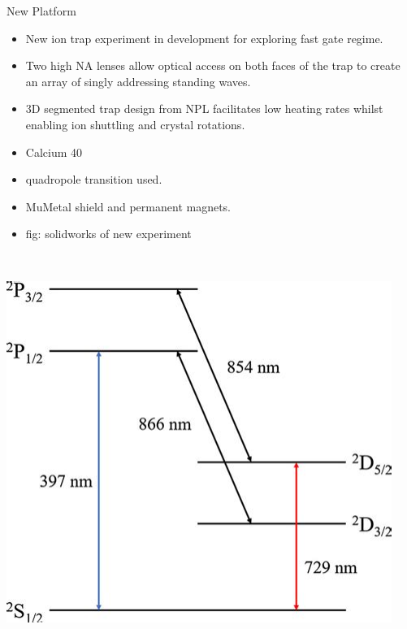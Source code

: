 \documentclass[final]{beamer}
\begin{document}
\begin{frame}{}
\begin{center}
\begin{columns}[t]
\begin{column}{0.49\textwidth}
    \begin{alertblock}{New Platform}
      \begin{minipage}{0.58\textwidth}
      \begin{itemize}
      \item New ion trap experiment in development for exploring fast
        gate regime.
      \item Two high NA lenses allow optical
        access on both faces of the trap to create an array of singly
        addressing standing waves.
      \item 3D segmented trap design from NPL facilitates low heating
        rates whilst enabling ion shuttling and crystal rotations.
      \item Calcium 40
      \item quadropole transition used.
      \item MuMetal shield and permanent magnets.
      \item fig: solidworks of new experiment
      \end{itemize}
      \end{minipage}
      ~~
      \begin{minipage}{0.35\textwidth}
      \includegraphics[width=0.94\textwidth]{./figs/ca_struct_tmp.jpeg}
      \end{minipage}


\end{alertblock}
\end{column}
\end{columns}
\end{center}
\end{frame}
\end{document}
